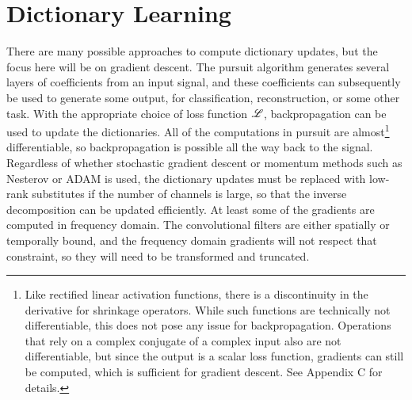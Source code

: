 \section{Dictionary Learning}
There are many possible approaches to compute dictionary updates, but the focus here will be on gradient descent. The pursuit algorithm generates several layers of coefficients from an input signal, and these coefficients can subsequently be used to generate some output, for classification, reconstruction, or some other task. With the appropriate choice of loss function $\mathscr{L}$, backpropagation can be used to update the dictionaries. All of the computations in pursuit are almost\footnote{Like rectified linear activation functions, there is a discontinuity in the derivative for shrinkage operators. While such functions are technically not differentiable, this does not pose any issue for backpropagation. Operations that rely on a complex conjugate of a complex input also are not differentiable, but since the output is a scalar loss function, gradients can still be computed, which is sufficient for gradient descent. See Appendix C for details.} differentiable, so backpropagation is possible all the way back to the signal. Regardless of whether stochastic gradient descent or momentum methods such as Nesterov \cite{sutskever2013importance} or ADAM \cite{kingma2017adam} is used, the dictionary updates must be replaced with low-rank substitutes if the number of channels is large, so that the inverse decomposition can be updated efficiently. At least some of the gradients are computed in frequency domain. The convolutional filters are either spatially or temporally bound, and the frequency domain gradients will not respect that constraint, so they will need to be transformed and truncated.

